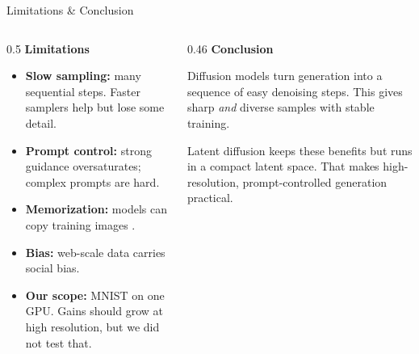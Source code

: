\documentclass[11pt,aspectratio=169]{beamer}
\newcommand{\Head}[1]{\textcolor{Main}{\textbf{#1}}}
\begin{document}
\begin{frame}{Limitations \& Conclusion}
  \begin{columns}[T,onlytextwidth]
    \begin{column}{0.5\textwidth}
      \Head{Limitations}
      \begin{itemize}\setlength{\itemsep}{1pt}
        \item \textbf{Slow sampling:} many sequential steps. Faster samplers \cite{song2021denoising,lu2022dpm} help but lose some detail.
        \item \textbf{Prompt control:} strong guidance oversaturates; complex prompts are hard.
        \item \textbf{Memorization:} models can copy training images \cite{carlini2023extracting}.
        \item \textbf{Bias:} web-scale data carries social bias.
        \item \textbf{Our scope:} MNIST on one GPU. Gains should grow at high resolution, but we did not test that.
      \end{itemize}
    \end{column}
    \begin{column}{0.46\textwidth}
      \Head{Conclusion}
      \vspace{0.1cm}

      Diffusion models turn generation into a sequence of easy denoising steps. This gives sharp \emph{and} diverse samples with stable training.

      \vspace{0.2cm}
      Latent diffusion keeps these benefits but runs in a compact latent space. That makes high-resolution, prompt-controlled generation practical.
    \end{column}
  \end{columns}
\end{frame}
\end{document}
